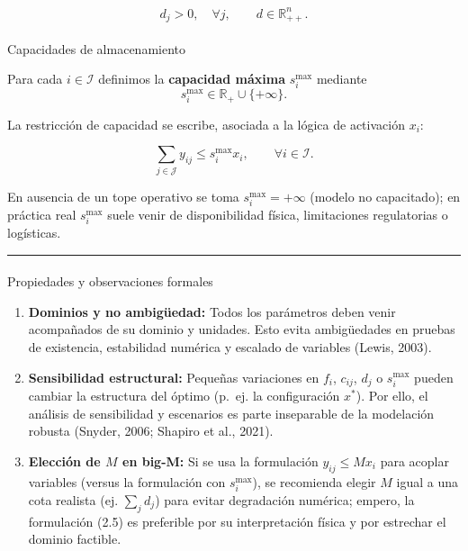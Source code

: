 \documentclass[
  spanish,
  letterpaper,
  DIV=11,
  numbers=noendperiod]{scrartcl}
\makeatletter
\let\oldparagraph\paragraph
\renewcommand{\paragraph}{
    \@ifstar
      \xxxParagraphStar
      \xxxParagraphNoStar
  }
\newcommand{\xxxParagraphStar}[1]{\oldparagraph*{#1}\mbox{}}
\newcommand{\xxxParagraphNoStar}[1]{\oldparagraph{#1}\mbox{}}
\makeatother
\begin{document}
\[
d_j>0,\quad \forall j,\qquad d\in\mathbb{R}_{++}^n.
\]

\paragraph{Capacidades de
almacenamiento}\label{capacidades-de-almacenamiento}

Para cada \(i\in\mathcal{I}\) definimos la \textbf{capacidad máxima}
\(s_i^{\max}\) mediante \[
s_i^{\max}\in\mathbb{R}_{+}\cup\{+\infty\}.
\]

La restricción de capacidad se escribe, asociada a la lógica de
activación \(x_i\):

\[
\sum_{j\in\mathcal{J}} y_{ij} \le s_i^{\max} x_i,\qquad \forall i\in\mathcal{I}. \tag{2.5}
\]

En ausencia de un tope operativo se toma \(s_i^{\max}=+\infty\) (modelo
no capacitado); en práctica real \(s_i^{\max}\) suele venir de
disponibilidad física, limitaciones regulatorias o logísticas.

\begin{center}\rule{0.5\linewidth}{0.5pt}\end{center}

\paragraph{Propiedades y observaciones
formales}\label{propiedades-y-observaciones-formales}

\begin{enumerate}
\def\labelenumi{\arabic{enumi}.}
\item
  \textbf{Dominios y no ambigüedad:} Todos los parámetros deben venir
  acompañados de su dominio y unidades. Esto evita ambigüedades en
  pruebas de existencia, estabilidad numérica y escalado de variables
  (Lewis, 2003).
\item
  \textbf{Sensibilidad estructural:} Pequeñas variaciones en \(f_i\),
  \(c_{ij}\), \(d_j\) o \(s_i^{\max}\) pueden cambiar la estructura del
  óptimo (p.~ej. la configuración \(x^*\)). Por ello, el análisis de
  sensibilidad y escenarios es parte inseparable de la modelación
  robusta (Snyder, 2006; Shapiro et al., 2021).
\item
  \textbf{Elección de \(M\) en big-M:} Si se usa la formulación
  \(y_{ij}\le M x_i\) para acoplar variables (versus la formulación con
  \(s_i^{\max}\)), se recomienda elegir \(M\) igual a una cota realista
  (ej. \(\sum_j d_j\)) para evitar degradación numérica; empero, la
  formulación (2.5) es preferible por su interpretación física y por
  estrechar el dominio factible.
\end{enumerate}
\end{document}
